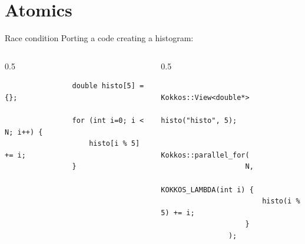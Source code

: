 \documentclass[
    aspectratio=169,
    \createHandout
]{beamer}
\begin{document}

\section{Atomics}

\begin{frame}[fragile]{Race condition}
    Porting a code creating a histogram:
    \begin{columns}
        \begin{column}{0.5\linewidth}
            \begin{verbatim}
                double histo[5] = {};

                for (int i=0; i < N; i++) {
                    histo[i % 5] += i;
                }
            \end{verbatim}
        \end{column}
        \pause
        \begin{column}{0.5\linewidth}
            \begin{verbatim}
                Kokkos::View<double*>
                    histo("histo", 5);

                Kokkos::parallel_for(
                    N,
                    KOKKOS_LAMBDA(int i) {
                        histo(i % 5) += i;
                    }
                );
            \end{verbatim}
        \end{column}
    \end{columns}
\end{frame}
\end{document}
